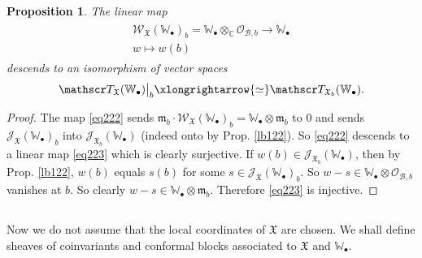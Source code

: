 \documentclass[11pt,b5paper,notitlepage]{article}
\theoremstyle{definition}
\theoremstyle{plain}
\newtheorem{pp}[df]{Proposition}
\newcommand{\fk}{\mathfrak}
\newcommand{\mc}{\mathcal}
\newcommand{\scr}{\mathscr}
\newcommand{\blt}{\bullet}
\newcommand{\Wbb}{\mathbb W}
\newcommand{\Cbb}{\mathbb C}
\numberwithin{equation}{section}
\begin{document}
\begin{pp}\label{lb134}
The linear map 
\begin{gather}\label{eq222}
\begin{gathered}
\scr W_{\fk X}(\Wbb_\blt)_b=\Wbb_\blt\otimes_\Cbb\scr O_{\mc B,b}\rightarrow \Wbb_\blt\\
w\mapsto w(b)
\end{gathered}
\end{gather}
descends to an isomorphism of vector spaces
\begin{align}\label{eq223}
\scr T_{\fk X}(\Wbb_\blt)\big|_b\xlongrightarrow{\simeq} \scr T_{\fk X_b}(\Wbb_\blt).
\end{align}
\end{pp}

\begin{proof}
The map \eqref{eq222} sends $\fk m_b\cdot \scr W_{\fk X}(\Wbb_\blt)_b=\Wbb_\blt\otimes \fk m_b$ to $0$ and sends $\scr J_{\fk X}(\Wbb_\blt)_b$ into $\scr J_{\fk X_b}(\Wbb_\blt)$ (indeed onto by Prop. \ref{lb122}). So \eqref{eq222} descends to a linear map \eqref{eq223} which is clearly surjective. If $w(b)\in\scr J_{\fk X_b}(\Wbb_\blt)$, then by Prop. \ref{lb122}, $w(b)$ equals $s(b)$ for some $s\in\scr J_{\fk X}(\Wbb_\blt)_b$. So $w-s\in\Wbb_\blt\otimes \scr O_{\mc B,b}$ vanishes at $b$. So clearly $w-s\in\Wbb_\blt\otimes \fk m_b$. Therefore \eqref{eq223} is injective.
\end{proof}



\subsection{}\label{lb190}

Now we do not assume that the local coordinates of $\fk X$ are chosen. We shall define sheaves of coinvariants and conformal blocks associated to $\fk X$ and $\Wbb_\blt$.
\end{document}
